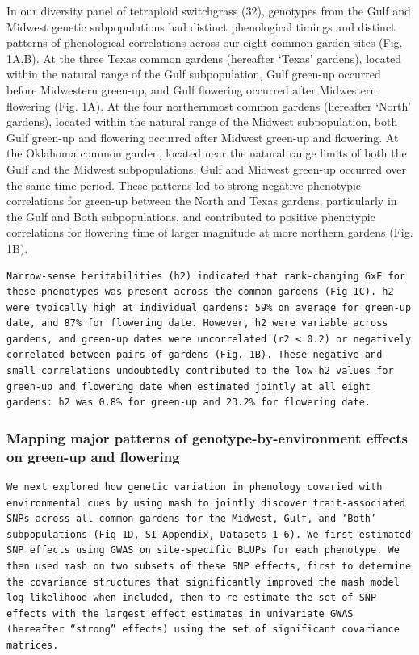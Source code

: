 \documentclass[
  9pt,
  twocolumn,
  twoside]{pnas-new}
\begin{document}
In our diversity panel of tetraploid switchgrass (32), genotypes from
the Gulf and Midwest genetic subpopulations had distinct phenological
timings and distinct patterns of phenological correlations across our
eight common garden sites (Fig. 1A,B). At the three Texas common gardens
(hereafter `Texas' gardens), located within the natural range of the
Gulf subpopulation, Gulf green-up occurred before Midwestern green-up,
and Gulf flowering occurred after Midwestern flowering (Fig. 1A). At the
four northernmost common gardens (hereafter `North' gardens), located
within the natural range of the Midwest subpopulation, both Gulf
green-up and flowering occurred after Midwest green-up and flowering. At
the Oklahoma common garden, located near the natural range limits of
both the Gulf and the Midwest subpopulations, Gulf and Midwest green-up
occurred over the same time period. These patterns led to strong
negative phenotypic correlations for green-up between the North and
Texas gardens, particularly in the Gulf and Both subpopulations, and
contributed to positive phenotypic correlations for flowering time of
larger magnitude at more northern gardens (Fig. 1B).

\begin{verbatim}
Narrow-sense heritabilities (h2) indicated that rank-changing GxE for these phenotypes was present across the common gardens (Fig 1C). h2 were typically high at individual gardens: 59% on average for green-up date, and 87% for flowering date. However, h2 were variable across gardens, and green-up dates were uncorrelated (r2 < 0.2) or negatively correlated between pairs of gardens (Fig. 1B). These negative and small correlations undoubtedly contributed to the low h2 values for green-up and flowering date when estimated jointly at all eight gardens: h2 was 0.8% for green-up and 23.2% for flowering date.
\end{verbatim}

\subsubsection{Mapping major patterns of genotype-by-environment effects
on green-up and
flowering}\label{mapping-major-patterns-of-genotype-by-environment-effects-on-green-up-and-flowering}

\begin{verbatim}
We next explored how genetic variation in phenology covaried with environmental cues by using mash to jointly discover trait-associated SNPs across all common gardens for the Midwest, Gulf, and ‘Both’ subpopulations (Fig 1D, SI Appendix, Datasets 1-6). We first estimated SNP effects using GWAS on site-specific BLUPs for each phenotype. We then used mash on two subsets of these SNP effects, first to determine the covariance structures that significantly improved the mash model log likelihood when included, then to re-estimate the set of SNP effects with the largest effect estimates in univariate GWAS (hereafter “strong” effects) using the set of significant covariance matrices. 
\end{verbatim}
\end{document}
